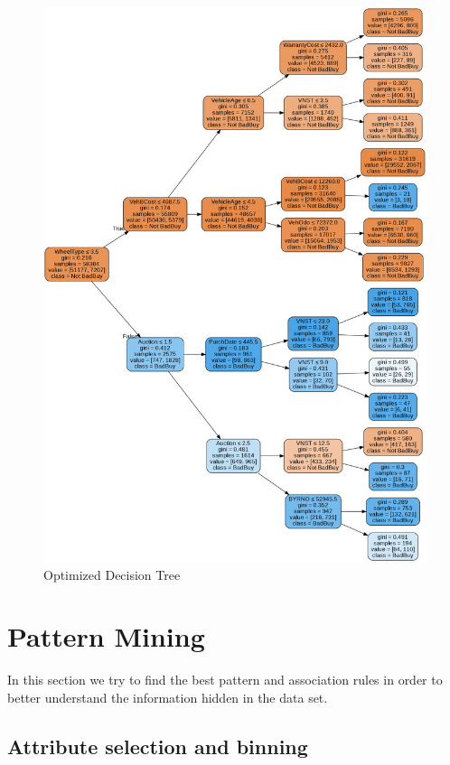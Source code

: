 \documentclass{article}
\begin{document}
	\begin{figure}[H]
		\centering
		\includegraphics[height=.95\textheight]{dectree.png}
		\caption{Optimized Decision Tree}
		\label{fig:optdectree}
	\end{figure}
	
	
	\newpage
	\section{Pattern Mining}
	\label{sec:patternmining}
	In this section we try to find the best pattern and association rules in order to better understand the information hidden in the data set.
	
	\subsection{Attribute selection and binning}
	
\end{document}
